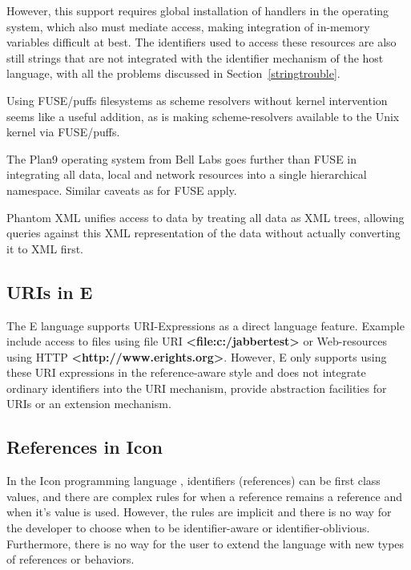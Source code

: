\documentclass[preprint,authoryear]{acm_proc_article-sp}
\begin{document}
However, this support requires global installation of handlers in the operating
system, which also must mediate access, making integration of in-memory 
variables difficult at best.  The identifiers used to access these resources
are also still strings that are not integrated with the identifier mechanism of
the host language, with all the problems discussed in Section~\ref{stringtrouble}.

Using FUSE/puffs filesystems as scheme resolvers without kernel intervention seems
like a useful addition, as is making scheme-resolvers available to the Unix kernel
via FUSE/puffs.

The Plan9\cite{plan9names}\cite{plan9network} operating system from Bell Labs goes further than FUSE in integrating
all data, local and network resources into a single hierarchical namespace.  Similar
caveats as for FUSE apply.

Phantom XML\cite{phantomxml} unifies access to data by treating all data as
XML trees, allowing queries against this XML representation of the data without
actually converting it to XML first.  




\subsection{URIs in E}

The E language\cite{MillerRobustComposition}  supports URI-Expressions as a
direct language feature.  Example include access to files
using file URI  {\bf <file:c:/jabbertest>} or Web-resources using HTTP {\bf <http://www.erights.org>}.  However,
E only supports using these URI expressions in the reference-aware style and does not integrate 
ordinary identifiers into the URI mechanism, provide abstraction facilities 
for URIs or an extension mechanism. 


\subsection{References in Icon}

In the Icon programming language \cite{IconRef} , identifiers (references) can be first class values,
and there are complex rules for when a reference remains a reference and when
it's value is used.  However, the rules are implicit and there is no way for the 
developer to choose when to be identifier-aware or identifier-oblivious.  Furthermore,
there is no way for the user to extend the language with new types of references 
or behaviors.
\end{document}

